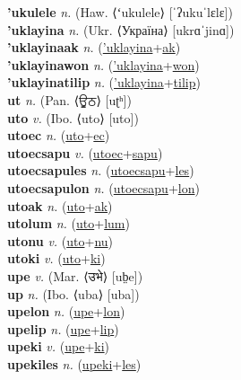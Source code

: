 \textbf{'ukulele} \textit{n.} (Haw. ⟨ʻukulele⟩ [ˈʔukuˈlɛlɛ])
 \label{'ukulele} \\
\textbf{'uklayina} \textit{n.} (Ukr. ⟨Україна⟩ [ukrɑˈjinɑ])
 \label{'uklayina} \\
\textbf{'uklayinaak} \textit{n.} (\hyperref['uklayina]{'uklayina}+\hyperref[ak]{ak})
 \label{'uklayinaak} \\
\textbf{'uklayinawon} \textit{n.} (\hyperref['uklayina]{'uklayina}+\hyperref[won]{won})
 \label{'uklayinawon} \\
\textbf{'uklayinatilip} \textit{n.} (\hyperref['uklayina]{'uklayina}+\hyperref[tilip]{tilip})
 \label{'uklayinatilip} \\
\textbf{ut} \textit{n.} (Pan. ⟨ਊਠ⟩ [uʈʰ])
 \label{ut} \\
\textbf{uto} \textit{v.} (Ibo. ⟨uto⟩ [uto])
 \label{uto} \\
\textbf{utoec} \textit{n.} (\hyperref[uto]{uto}+\hyperref[ec]{ec})
 \label{utoec} \\
\textbf{utoecsapu} \textit{v.} (\hyperref[utoec]{utoec}+\hyperref[sapu]{sapu})
 \label{utoecsapu} \\
\textbf{utoecsapules} \textit{n.} (\hyperref[utoecsapu]{utoecsapu}+\hyperref[les]{les})
 \label{utoecsapules} \\
\textbf{utoecsapulon} \textit{n.} (\hyperref[utoecsapu]{utoecsapu}+\hyperref[lon]{lon})
 \label{utoecsapulon} \\
\textbf{utoak} \textit{n.} (\hyperref[uto]{uto}+\hyperref[ak]{ak})
 \label{utoak} \\
\textbf{utolum} \textit{n.} (\hyperref[uto]{uto}+\hyperref[lum]{lum})
 \label{utolum} \\
\textbf{utonu} \textit{v.} (\hyperref[uto]{uto}+\hyperref[nu]{nu})
 \label{utonu} \\
\textbf{utoki} \textit{v.} (\hyperref[uto]{uto}+\hyperref[ki]{ki})
 \label{utoki} \\
\textbf{upe} \textit{v.} (Mar. ⟨उभे⟩ [ub̤e])
 \label{upe} \\
\textbf{up} \textit{n.} (Ibo. ⟨uba⟩ [uba])
 \label{up} \\
\textbf{upelon} \textit{n.} (\hyperref[upe]{upe}+\hyperref[lon]{lon})
 \label{upelon} \\
\textbf{upelip} \textit{n.} (\hyperref[upe]{upe}+\hyperref[lip]{lip})
 \label{upelip} \\
\textbf{upeki} \textit{v.} (\hyperref[upe]{upe}+\hyperref[ki]{ki})
 \label{upeki} \\
\textbf{upekiles} \textit{n.} (\hyperref[upeki]{upeki}+\hyperref[les]{les})
 \label{upekiles} \\
